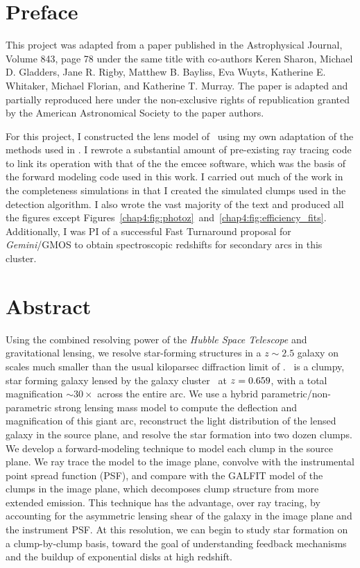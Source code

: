 \section{Preface}

This project was adapted from a paper published in the Astrophysical Journal, Volume 843, page 78 under the same title with co-authors Keren Sharon, Michael D. Gladders, Jane R. Rigby, Matthew B. Bayliss, Eva Wuyts, Katherine E. Whitaker, Michael Florian, and Katherine T. Murray. The paper is adapted and partially reproduced here under the non-exclusive rights of republication granted by the American Astronomical Society to the paper authors.

For this project, I constructed the lens model of \cluster\ using my own adaptation of the methods used in \citet{Jullo:2009ij}. I rewrote a substantial amount of pre-existing ray tracing code to link its operation with that of the the emcee software, which was the basis of the forward modeling code used in this work. I carried out much of the work in the completeness simulations in that I created the simulated clumps used in the detection algorithm. I also wrote the vast majority of the text and produced all the figures except Figures~\ref{chap4:fig:photoz}~and~\ref{chap4:fig:efficiency_fits}. Additionally, I was PI of a successful Fast Turnaround proposal for \textit{Gemini}/GMOS to obtain spectroscopic redshifts for secondary arcs in this cluster.

\section{Abstract}
Using the combined resolving power of the {\it Hubble Space Telescope} and gravitational lensing, we resolve star-forming structures in a $z\sim2.5$ galaxy on scales much smaller than the usual kiloparsec diffraction limit of \hst. \giantarc\ is a clumpy, star forming galaxy lensed by the galaxy cluster \cluster\ at $z=0.659$, with a total magnification $\sim30\times$ across the entire arc. We use a hybrid parametric/non-parametric strong lensing mass model to compute the deflection and magnification of this giant arc, reconstruct the light distribution of the lensed galaxy in the source plane, and resolve the star formation into two dozen clumps. We develop a forward-modeling technique to model each clump in the source plane. We ray trace the model to the image plane, convolve with the instrumental point spread function (PSF), and compare with the GALFIT model of the clumps in the image plane, which decomposes clump structure from more extended emission. This technique has the advantage, over ray tracing, by accounting for the asymmetric lensing shear of the galaxy in the image plane and the instrument PSF. At this resolution, we can begin to study star formation on a clump-by-clump basis, toward the goal of understanding feedback mechanisms and the buildup of exponential disks at high redshift.

